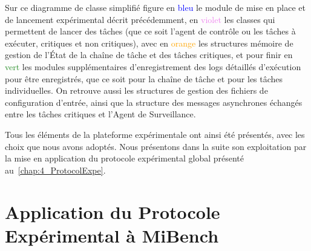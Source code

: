 \documentclass[french, a4paper, 11pt, twoside, pdftex]{StyleThese}
\begin{document}
    Sur ce diagramme de classe simplifié figure en \textcolor{blue}{bleu} le module de mise en place et de lancement expérimental décrit précédemment, en \textcolor{violet}{violet} les classes qui permettent de lancer des tâches (que ce soit l'agent de contrôle ou les tâches à exécuter, critiques et non critiques), avec en \textcolor{orange}{orange} les structures mémoire de gestion de l'État de la chaîne de tâche et des tâches critiques, et pour finir en \textcolor{ForestGreen}{vert} les modules supplémentaires d'enregistrement des logs détaillés d'exécution pour être enregistrés, que ce soit pour la chaîne de tâche et pour les tâches individuelles. On retrouve aussi les structures de gestion des fichiers de configuration d'entrée, ainsi que la structure des messages asynchrones échangés entre les tâches critiques et l'Agent de Surveillance.
    
	Tous les éléments de la plateforme expérimentale ont ainsi été présentés, avec les choix que nous avons adoptés. Nous présentons dans la suite son exploitation par la mise en application du protocole expérimental global présenté au~\autoref{chap:4_ProtocolExpe}.
    	
\section{Application du Protocole Expérimental à MiBench}
\end{document}
